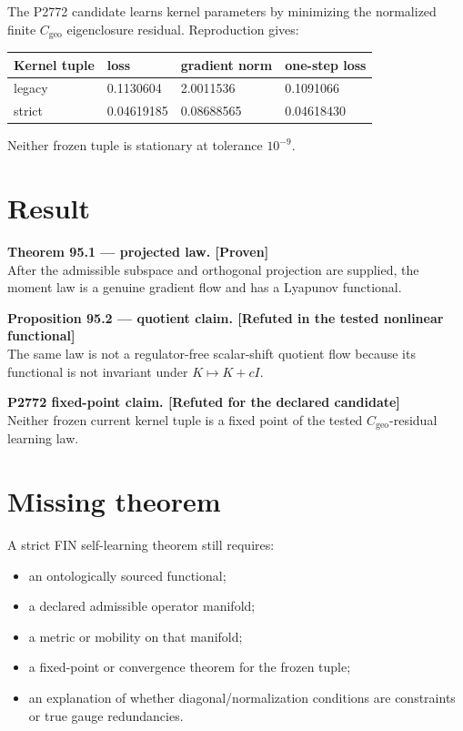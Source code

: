 \documentclass[11pt,a4paper,openany]{report}
\newcommand{\statusProven}{\textcolor{fingreen}{[Proven]}}
\begin{document}
The P2772 candidate learns kernel parameters by minimizing the normalized finite \(C_{\mathrm{geo}}\) eigenclosure residual. Reproduction gives:

\begin{center}
\begingroup\small
\setlength{\tabcolsep}{3.5pt}
\renewcommand{\arraystretch}{1.16}
\begin{longtable}{@{}p{}p{}p{}p{}@{}}
\toprule
\textbf{Kernel tuple} & \textbf{loss} & \textbf{gradient norm} & \textbf{one-step loss} \\
\midrule
\endhead
legacy & 0.1130604 & 2.0011536 & 0.1091066 \\
strict & 0.04619185 & 0.08688565 & 0.04618430 \\
\bottomrule
\end{longtable}
\endgroup
\end{center}

Neither frozen tuple is stationary at tolerance \(10^{-9}\).

\section{Result}

\textbf{Theorem 95.1 --- projected law. \statusProven{}}\\
After the admissible subspace and orthogonal projection are supplied, the moment law is a genuine gradient flow and has a Lyapunov functional.

\textbf{Proposition 95.2 --- quotient claim. [Refuted in the tested nonlinear functional]}\\
The same law is not a regulator-free scalar-shift quotient flow because its functional is not invariant under \(K\mapsto K+cI\).

\textbf{P2772 fixed-point claim. [Refuted for the declared candidate]}\\
Neither frozen current kernel tuple is a fixed point of the tested \(C_{\mathrm{geo}}\)-residual learning law.

\section{Missing theorem}

A strict FIN self-learning theorem still requires:

\begin{itemize}
\item 
an ontologically sourced functional;

\item 
a declared admissible operator manifold;

\item 
a metric or mobility on that manifold;

\item 
a fixed-point or convergence theorem for the frozen tuple;

\item 
an explanation of whether diagonal/\allowbreak{}normalization conditions are constraints or true gauge redundancies.

\end{itemize}
\end{document}
